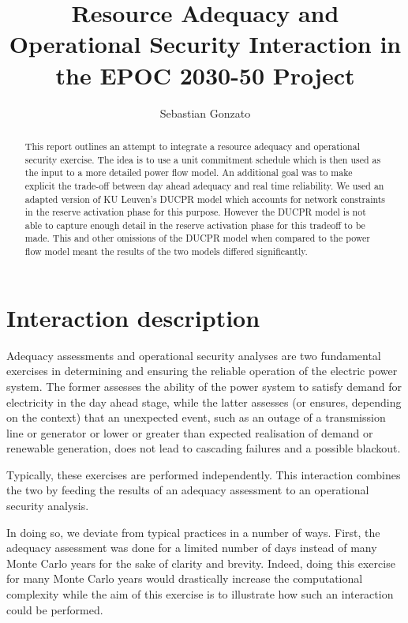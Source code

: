 \documentclass[number,times]{elsarticle}
\begin{document}
\title{Resource Adequacy and Operational Security Interaction in the EPOC 2030-50 Project}

\author{Sebastian Gonzato}

\maketitle

\begin{abstract}
    This report outlines an attempt to integrate a resource adequacy and operational security exercise. The idea is to use a unit commitment schedule which is then used as the input to a more detailed power flow model. An additional goal was to make explicit the trade-off between day ahead adequacy and real time reliability. We used an adapted version of KU Leuven's \ac{DUCPR} model which accounts for network constraints in the reserve activation phase for this purpose. However the \ac{DUCPR} model is not able to capture enough detail in the reserve activation phase for this tradeoff to be made. This and other omissions of the \ac{DUCPR} model when compared to the power flow model meant the results of the two models differed significantly.
\end{abstract}

\newpage

\tableofcontents



\newpage

\section{Interaction description}

Adequacy assessments and operational security analyses are two fundamental exercises in determining and ensuring the reliable operation of the electric power system. The former assesses the ability of the power system to satisfy demand for electricity in the day ahead stage, while the latter assesses (or ensures, depending on the context) that an unexpected event, such as an outage of a transmission line or generator or lower or greater than expected realisation of demand or renewable generation, does not lead to cascading failures and a possible blackout.

Typically, these exercises are performed independently. This interaction combines the two by feeding the results of an adequacy assessment to an operational security analysis.

In doing so, we deviate from typical practices in a number of ways. First, the adequacy assessment was done for a limited number of days instead of many Monte Carlo years for the sake of clarity and brevity. Indeed, doing this exercise for many Monte Carlo years would drastically increase the computational complexity while the aim of this exercise is to illustrate how such an interaction could be performed.
\end{document}
